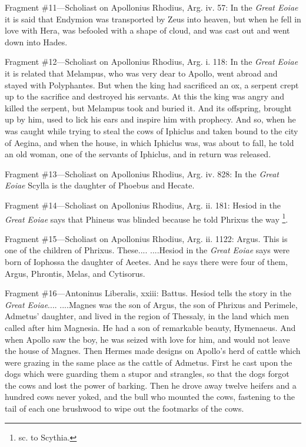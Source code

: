 Fragment \#11—Scholiast on Apollonius Rhodius, Arg. iv. 57: In the
\emph{Great Eoiae} it is said that Endymion was transported by Zeus into
heaven, but when he fell in love with Hera, was befooled with a shape of cloud,
and was cast out and went down into Hades.

Fragment \#12—Scholiast on Apollonius Rhodius, Arg. i. 118: In the
\emph{Great Eoiae} it is related that Melampus, who was very dear to
Apollo, went abroad and stayed with Polyphantes. But when the king had
sacrificed an ox, a serpent crept up to the sacrifice and destroyed his
servants. At this the king was angry and killed the serpent, but Melampus took
and buried it. And its offspring, brought up by him, used to lick his ears and
inspire him with prophecy. And so, when he was caught while trying to steal the
cows of Iphiclus and taken bound to the city of Aegina, and when the house, in
which Iphiclus was, was about to fall, he told an old woman, one of the
servants of Iphiclus, and in return was released.

Fragment \#13—Scholiast on Apollonius Rhodius, Arg. iv. 828: In the
\emph{Great Eoiae} Scylla is the daughter of Phoebus and Hecate.

Fragment \#14—Scholiast on Apollonius Rhodius, Arg. ii. 181: Hesiod in the
\emph{Great Eoiae} says that Phineus was blinded because he told Phrixus
the way \footnote{sc. to Scythia.}.

Fragment \#15—Scholiast on Apollonius Rhodius, Arg. ii. 1122: Argus. This
is one of the children of Phrixus. These.... ....Hesiod in the \emph{Great
Eoiae} says were born of Iophossa the daughter of Aeetes. And he says
there were four of them, Argus, Phrontis, Melas, and Cytisorus.

Fragment \#16—Antoninus Liberalis, xxiii: Battus. Hesiod tells the story
in the \emph{Great Eoiae}.... ....Magnes was the son of Argus, the son
of Phrixus and Perimele, Admetus’ daughter, and lived in the region of
Thessaly, in the land which men called after him Magnesia. He had a son of
remarkable beauty, Hymenaeus. And when Apollo saw the boy, he was seized with
love for him, and would not leave the house of Magnes. Then Hermes made designs
on Apollo’s herd of cattle which were grazing in the same place as the
cattle of Admetus. First he cast upon the dogs which were guarding them a
stupor and strangles, so that the dogs forgot the cows and lost the power of
barking. Then he drove away twelve heifers and a hundred cows never yoked, and
the bull who mounted the cows, fastening to the tail of each one brushwood to
wipe out the footmarks of the cows.

